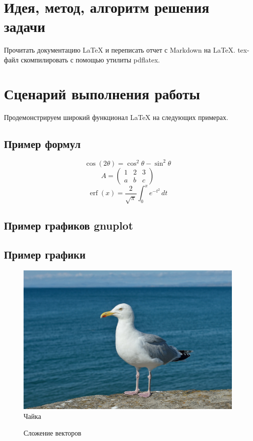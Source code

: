 \documentclass[12pt, letterpaper]{article}
\DeclareMathOperator\erf{erf}
\begin{document}
\section{Идея, метод, алгоритм решения задачи}
Прочитать документацию \LaTeX{} и переписать отчет с Markdown на \LaTeX{}. tex-файл скомпилировать с помощью утилиты pdflatex.
\section{Сценарий выполнения работы}
Продемонстрируем широкий функционал \LaTeX{} на следующих примерах.
\subsection{Пример формул}
\[\cos (2\theta) = \cos^2 \theta - \sin^2 \theta\]
\[A=
\begin{pmatrix}
1 & 2 & 3\\
a & b & c
\end{pmatrix}\]
\[
\erf(x)=\frac{2}{\sqrt{\pi}}\int_{0}^{x}e^{-t^{2}}\, dt
\]
\subsection{Пример графиков gnuplot}

\subsection{Пример графики}
\begin{figure}[H]
\includegraphics{gull}
\centering
\caption{Чайка}
\end{figure}
\begin{figure}[H]
\centering
\caption{Сложение векторов}
\end{figure}
\end{document}
